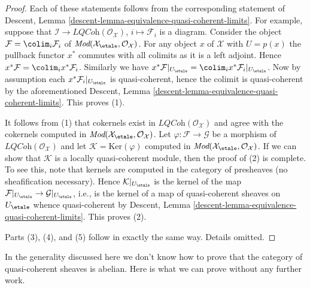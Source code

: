 \begin{proof}
Each of these statements follows from the corresponding statement of
Descent, Lemma \ref{descent-lemma-equivalence-quasi-coherent-limits}.
For example, suppose that
$\mathcal{I} \to \textit{LQCoh}(\mathcal{O}_\mathcal{X})$,
$i \mapsto \mathcal{F}_i$ is a diagram.
Consider the object $\mathcal{F} = \colim_i \mathcal{F}_i$ of
$\textit{Mod}(\mathcal{X}_\etale, \mathcal{O}_\mathcal{X})$.
For any object $x$ of $\mathcal{X}$ with $U = p(x)$ the pullback functor
$x^*$ commutes with all colimits as it is a left adjoint. Hence
$x^*\mathcal{F} = \colim_i x^*\mathcal{F}_i$. Similarly we have
$x^*\mathcal{F}|_{U_\etale} =
\colim_i x^*\mathcal{F}_i|_{U_\etale}$.
Now by assumption each $x^*\mathcal{F}_i|_{U_\etale}$
is quasi-coherent, hence the colimit is quasi-coherent by the
aforementioned
Descent, Lemma \ref{descent-lemma-equivalence-quasi-coherent-limits}.
This proves (1).

\medskip\noindent
It follows from (1) that cokernels exist in
$\textit{LQCoh}(\mathcal{O}_\mathcal{X})$ and agree with the cokernels computed
in $\textit{Mod}(\mathcal{X}_\etale, \mathcal{O}_\mathcal{X})$.
Let $\varphi : \mathcal{F} \to \mathcal{G}$ be a morphism of
$\textit{LQCoh}(\mathcal{O}_\mathcal{X})$ and let
$\mathcal{K} = \text{Ker}(\varphi)$ computed in
$\textit{Mod}(\mathcal{X}_\etale, \mathcal{O}_\mathcal{X})$.
If we can show that $\mathcal{K}$ is a locally quasi-coherent module,
then the proof of (2) is complete. To see this, note that kernels
are computed in the category of presheaves (no sheafification necessary).
Hence $\mathcal{K}|_{U_\etale}$ is the kernel of the map
$\mathcal{F}|_{U_\etale} \to \mathcal{G}|_{U_\etale}$,
i.e., is the kernel of a map of quasi-coherent sheaves on $U_\etale$
whence quasi-coherent by
Descent, Lemma \ref{descent-lemma-equivalence-quasi-coherent-limits}.
This proves (2).

\medskip\noindent
Parts (3), (4), and (5) follow in exactly the same way. Details omitted.
\end{proof}

\noindent
In the generality discussed here we don't know how to prove
that the category of quasi-coherent sheaves is abelian.
Here is what we can prove without any further work.

